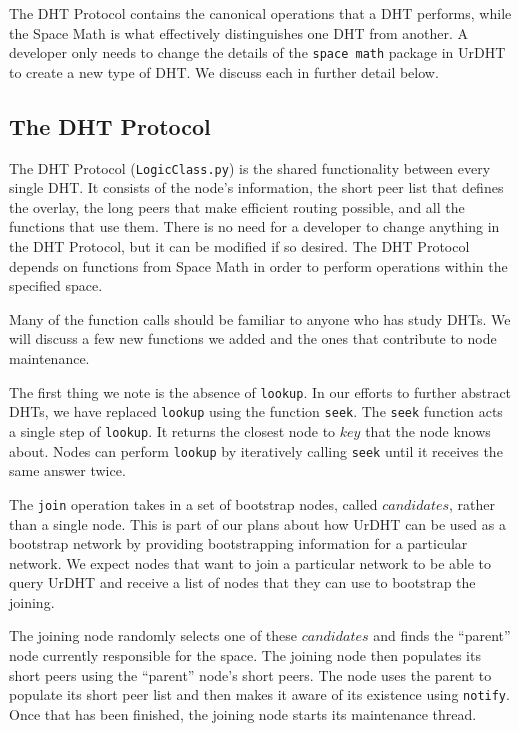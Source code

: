 \documentclass[11pt,conference]{IEEEtran}
\begin{document}
The DHT Protocol contains the canonical operations that a DHT performs, while the Space Math is what effectively distinguishes one DHT from another.
A developer only needs to change the details of the \texttt{space math} package in UrDHT to create a new type of DHT.
We discuss each in further detail below.

\subsection{The DHT Protocol }
\label{sec:protocol}

The DHT Protocol (\texttt{LogicClass.py}) \cite{urdht} is the shared functionality between every single DHT.
It consists of the node's information, the short peer list that defines the overlay, the long peers that make efficient routing possible, and all the functions that use them.
There is no need for a developer to change anything in the DHT Protocol, but it can be modified if so desired.
The DHT Protocol depends on functions from Space Math in order to perform operations within the specified space.

Many of the function calls should be familiar to anyone who has study DHTs.
We will discuss a few new functions we added and the ones that contribute to node maintenance.


The first thing we note is the absence of \texttt{lookup}.
In our efforts to further abstract DHTs, we have replaced \texttt{lookup} using the function \texttt{seek}.
The \texttt{seek} function acts a single step of \texttt{lookup}.
It returns the closest node to $ key $ that the node knows about.
Nodes can perform \texttt{lookup} by iteratively calling \texttt{seek} until it receives the same answer twice.


The \texttt{join} operation takes in a set of bootstrap nodes, called $ candidates $, rather than a single node.
This is part of our plans about how UrDHT can be used as a bootstrap network by providing bootstrapping information for a particular network.
We expect nodes that want to join a particular network to be able to query UrDHT and receive a list of nodes that they can use to bootstrap the joining.

The joining node randomly selects one of these $ candidates $ and finds the ``parent'' node currently responsible for the space.
The joining node then populates its short peers using the ``parent'' node's short peers.
The node  uses the parent to populate its short peer list and then makes it aware of its existence using \texttt{notify}.
Once that has been finished, the joining node starts its maintenance thread.
\end{document}
